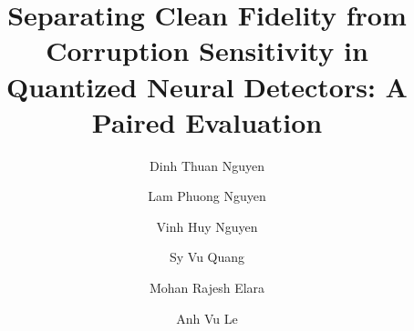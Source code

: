 \documentclass[a4paper,fleqn]{cas-dc}
\def\corref#1{}%
\def\orcidlink#1{}%
\begin{document}
\begin{titlepage}

\title[mode=title]{Separating Clean Fidelity from Corruption Sensitivity in Quantized Neural Detectors: A Paired Evaluation}
\author[mymainaddress]{Dinh Thuan Nguyen\orcidlink{0009-0008-6467-203X}}
\author[mymainaddress]{Lam Phuong Nguyen\orcidlink{0009-0007-3439-5871}}
\author[mysecondaryaddress]{Vinh Huy Nguyen\orcidlink{0009-0006-0878-9714}}
\author[mythirthaddress]{Sy Vu Quang}
\author[fourthaddress]{Mohan Rajesh Elara\orcidlink{0000-0001-6504-1530}}
\author[mythirthaddress]{Anh Vu Le\orcidlink{0000-0002-4804-7540}\corref{mycorrespondingauthor}}

\address[mymainaddress]{Faculty of Electrical and Electronics Engineering, Ton Duc Thang University, Ho Chi Minh City, Vietnam}
\address[mysecondaryaddress]{Center of Visualization and Simulation, Duy Tan University, Da Nang, Vietnam}
\address[mythirthaddress]{Advanced Intelligent Technology Research Group, Faculty of Electrical and Electronics Engineering, Ton Duc Thang University, 19 Nguyen Huu Tho Street, Tan Phong Ward, District 7, Ho Chi Minh City 700000, Vietnam}
\address[fourthaddress]{ROAR Lab, Engineering Product Development, Singapore University of Technology and Design, Singapore}


\end{titlepage}
\end{document}
